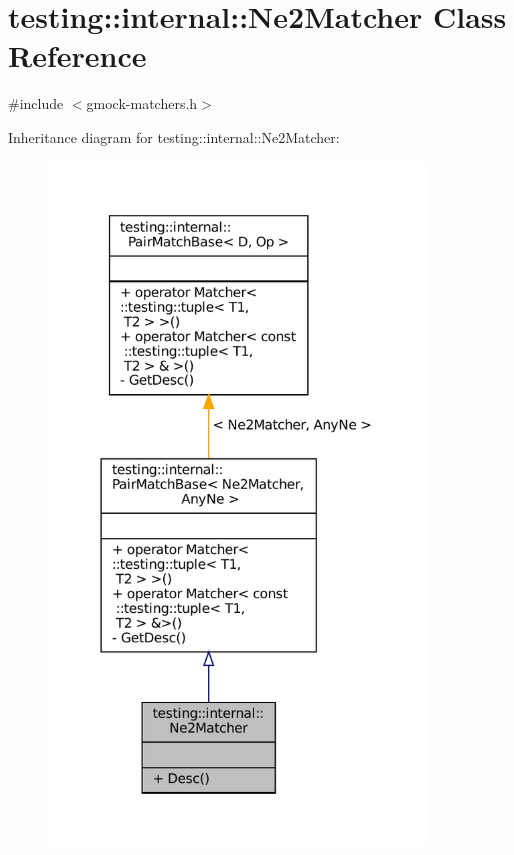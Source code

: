 \hypertarget{classtesting_1_1internal_1_1Ne2Matcher}{}\section{testing\+:\+:internal\+:\+:Ne2\+Matcher Class Reference}
\label{classtesting_1_1internal_1_1Ne2Matcher}


{\ttfamily \#include $<$gmock-\/matchers.\+h$>$}



Inheritance diagram for testing\+:\+:internal\+:\+:Ne2\+Matcher\+:
\nopagebreak
\begin{figure}[H]
\begin{center}
\leavevmode
\includegraphics[width=284pt]{classtesting_1_1internal_1_1Ne2Matcher__inherit__graph}
\end{center}
\end{figure}


